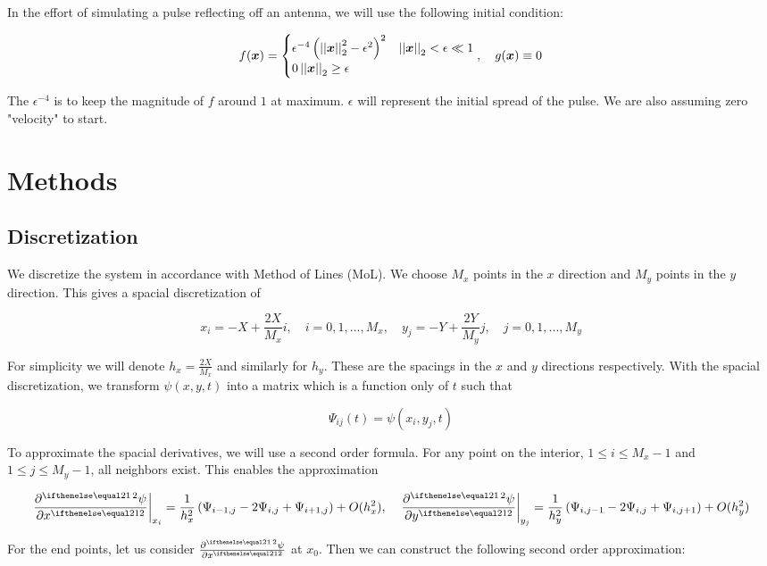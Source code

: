 \documentclass{article}
\begin{document}
In the effort of simulating a pulse reflecting off an antenna, we will
use the following initial condition:

$$f(\bm{x}) = \begin{cases}
\epsilon^{-4}\left(\left|\left| \bm{x} \right|\right|_{2}^2 - \epsilon^2\right)^2 &
\left|\left| \bm{x} \right|\right|_{2} < \epsilon \ll 1 \\
0 \left|\left| \bm{x} \right|\right|_{2} \geq \epsilon
\end{cases}, \quad g(\bm{x}) \equiv 0$$

The $\epsilon^{-4}$ is to keep the magnitude of $f$ around $1$ at maximum.
$\epsilon$ will represent the initial spread of the pulse.  We are also
assuming zero "velocity" to start.

\section{Methods}

\subsection{Discretization}

We discretize the system in accordance with Method of Lines (MoL).  We choose
$M_x$ points in the $x$ direction and $M_y$ points in the $y$ direction.
This gives a spacial discretization of

$$x_i = -X + \frac{2X}{M_x}i, \quad i = 0, 1, ..., M_x, \quad
y_j = -Y + \frac{2Y}{M_y}j, \quad j = 0, 1, ..., M_y$$

For simplicity we will denote $h_x = \frac{2X}{M_x}$ and similarly for $h_y$.
These are the spacings in the $x$ and $y$ directions respectively.
With the spacial discretization, we transform $\psi(x,y,t)$ into a matrix
which is a function only of $t$ such that

$$\Psi_{ij}(t) = \psi(x_i,y_j,t)$$

To approximate the spacial derivatives, we will use a second order formula.
For any point on the interior, $1 \leq i \leq M_x - 1$
and $1 \leq j \leq M_y - 1$, all neighbors exist.
This enables the approximation

$$\left.\pder[2]{\psi}{x}\right|_{x_i} =
\frac{1}{h_x^2} \left(\Psi_{i-1,j} - 2 \Psi_{i,j} + \Psi_{i+1,j}\right)
+ O(h_x^2), \quad
\left.\pder[2]{\psi}{y}\right|_{y_j} = \frac{1}{h_y^2}
\left(\Psi_{i,j-1} - 2 \Psi_{i,j} + \Psi_{i,j+1}\right) + O(h_y^2)$$

For the end points, let us consider $\pder[2]{\psi}{x}$ at $x_0$.
Then we can construct the following second order approximation:
\end{document}

